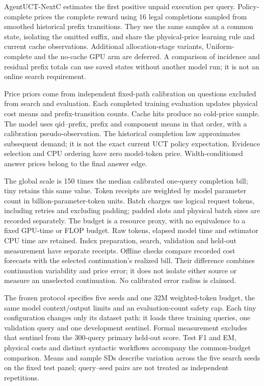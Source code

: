 AgentUCT-NextC estimates the first positive unpaid execution per query.
Policy-complete prices the complete reward using 16 legal completions sampled
from smoothed historical prefix transitions. They use the same samples at a
common state, isolating the omitted suffix, and share the physical-price
learning rule and current cache observations. Additional allocation-stage
variants, Uniform-complete and the no-cache GPU arm are deferred. A comparison
of incidence and residual prefix totals can use saved states without another
model run; it is not an online search requirement.

Price priors come from independent fixed-path calibration on questions excluded
from search and evaluation. Each completed training evaluation updates physical
cost means and prefix-transition counts. Cache hits produce no cold-price sample.
The model uses qid--prefix, prefix and component means in that order, with a
calibration pseudo-observation. The historical completion law approximates
subsequent demand; it is not the exact current UCT policy expectation.
Evidence selection and CPU ordering have zero model-token price. Width-conditioned
answer prices belong to the final answer edge.

The global scale is 150 times the median calibrated one-query completion bill;
tiny retains this same value. Token receipts are weighted by model parameter
count in billion-parameter-token units. Batch charges use logical request tokens,
including retries and excluding padding; padded slots and physical batch sizes
are recorded separately. The budget is a resource proxy, with no equivalence
to a fixed GPU-time or FLOP budget. Raw tokens, elapsed model time and
estimator CPU time are retained. Index preparation, search, validation and
held-out measurement have separate receipts. Offline checks compare recorded
cost forecasts with the selected continuation's realized bill. Their difference
combines continuation variability and price error; it does not isolate either
source or measure an unselected continuation. No calibrated error radius is claimed.

The frozen protocol specifies five seeds and one 32M weighted-token budget,
the same model context/output limits and an evaluation-count safety cap. Each tiny
configuration changes only its dataset path: it loads three training queries,
one validation query and one development sentinel. Formal measurement excludes
that sentinel from the 300-query primary held-out score. Test F1 and EM,
physical costs and distinct syntactic workflows accompany
the common-budget comparison. Means and sample SDs describe variation across
the five search seeds on the fixed test panel; query--seed pairs are not
treated as independent repetitions.

